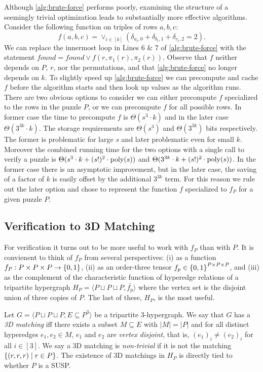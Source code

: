 \documentclass[11pt]{article}
\newcommand\sse{\subseteq}
\newcommand\condset[2]{\set{#1 \;|\; #2}}
\begin{document}
Although \autoref{alg:brute-force} performs poorly, examining the
structure of a seemingly trivial optimization leads to substantially
more effective algorithms. Consider the following function on triples
of rows $a, b, c$: $$f(a,b,c) = \vee_{i \in [k]} (\delta_{a_i,0} +
\delta_{b_i,1} + \delta_{c_i,2} = 2).$$ We can replace the innermost
loop in Lines 6 \& 7 of \autoref{alg:brute-force} with the statement
$found = found \vee f(r, \pi_1(r), \pi_2(r))$.  Observe that $f$
neither depends on $P$, $r$, nor the permutations, and that
\autoref{alg:brute-force} no longer depends on $k$.  To slightly speed
up \autoref{alg:brute-force} we can precompute and cache $f$ before
the algorithm starts and then look up values as the algorithm runs.
There are two obvious options to consider we can either precompute $f$
specialized to the rows in the puzzle $P$, or we can precompute $f$
for all possible rows.  In former case the time to precompute $f$ is
$\Theta(s^3 \cdot k)$ and in the later case $\Theta(3^{3k} \cdot k)$.
The storage requirements are $\Theta(s^3)$ and $\Theta(3^{3k})$ bits
respectively.  The former is problematic for large $s$ and later
problematic even for small $k$.  Moreover the combined running time
for the two options with a single call to verify a puzzle is
$\Theta(s^3 \cdot k + (s!)^2 \cdot \operatorname{poly}(s))$ and $\Theta(3^{3k} \cdot
k + (s!)^2 \cdot \operatorname{poly}(s))$.  In the former case there is an
asymptotic improvement, but in the later case, the saving of a factor
of $k$ is easily offset by the additional $3^{3k}$ term.  For this
reason we rule out the later option and chose to represent the
function $f$ specialized to $f_P$ for a given puzzle $P$.


\subsection{Verification to 3D Matching}
\label{sec:3DM}

For verification it turns out to be more useful to work with $f_P$
than with $P$.  It is convienent to think of $f_P$ from several
perspectives: (i) as a function $f_P : P \times P \times P \rightarrow
\left\{ 0, 1 \right\}$, (ii) as an order-three tensor $f_p \in \left\{ 0,1 \right\}^{P
  \times P \times P}$, and (iii) as the complement of the
characteristic function of hyperedge relations of a tripartite
hypergraph $H_P = \langle P \sqcup P \sqcup P, \bar{f_p}\rangle$ where
the vertex set is the disjoint union of three copies of $P$.  The last
of these, $H_P$, is the most useful.

Let $G = \langle P \sqcup P \sqcup P, E \sse P^3\rangle$ be a
tripartite 3-hypergraph.  We say that $G$ has a \emph{3D matching} iff
there exists a subset $M \sse E$ with $|M| = |P|$ and for all distinct
hyperedges $e_1, e_2 \in M$, $e_1$ and $e_2$ are \emph{vertex
  disjoint}, that is, $(e_1)_i \neq (e_2)_i$ for all $i \in [3]$.  We
say a 3D matching is \emph{non-trivial} if it is not the matching
$\condset{(r,r,r)}{r \in P}$.  The existence of 3D matchings in $H_P$
is directly tied to whether $P$ is a SUSP.
\end{document}
